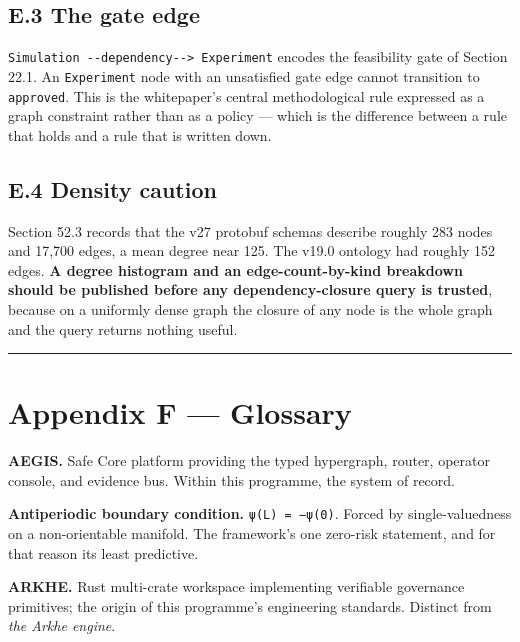 \documentclass[
  11pt]{report}
\begin{document}
\hypertarget{e.3-the-gate-edge}{%
\section{E.3 The gate edge}\label{e.3-the-gate-edge}}

\texttt{Simulation\ -\/-dependency-\/-\textgreater{}\ Experiment}
encodes the feasibility gate of Section 22.1. An \texttt{Experiment}
node with an unsatisfied gate edge cannot transition to
\texttt{approved}. This is the whitepaper's central methodological rule
expressed as a graph constraint rather than as a policy --- which is the
difference between a rule that holds and a rule that is written down.

\hypertarget{e.4-density-caution}{%
\section{E.4 Density caution}\label{e.4-density-caution}}

Section 52.3 records that the v27 protobuf schemas describe roughly 283
nodes and 17,700 edges, a mean degree near 125. The v19.0 ontology had
roughly 152 edges. \textbf{A degree histogram and an edge-count-by-kind
breakdown should be published before any dependency-closure query is
trusted}, because on a uniformly dense graph the closure of any node is
the whole graph and the query returns nothing useful.

\begin{center}\rule{0.5\linewidth}{0.5pt}\end{center}

\hypertarget{appendix-f-glossary}{%
\chapter{Appendix F --- Glossary}\label{appendix-f-glossary}}

\textbf{AEGIS.} Safe Core platform providing the typed hypergraph,
router, operator console, and evidence bus. Within this programme, the
system of record.

\textbf{Antiperiodic boundary condition.} \texttt{ψ(L)\ =\ −ψ(0)}.
Forced by single-valuedness on a non-orientable manifold. The
framework's one zero-risk statement, and for that reason its least
predictive.

\textbf{ARKHE.} Rust multi-crate workspace implementing verifiable
governance primitives; the origin of this programme's engineering
standards. Distinct from \emph{the Arkhe engine}.
\end{document}
